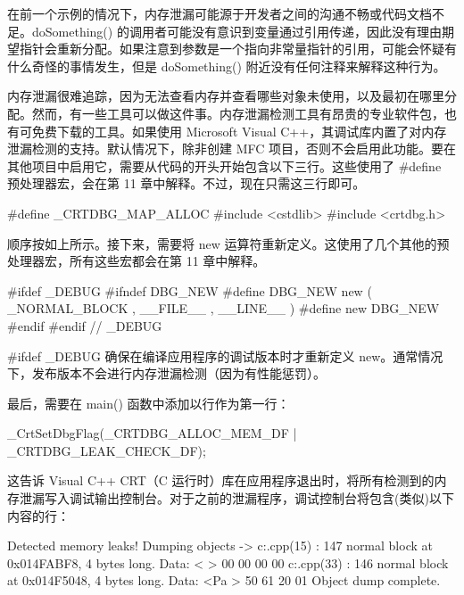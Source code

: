 在前一个示例的情况下，内存泄漏可能源于开发者之间的沟通不畅或代码文档不足。doSomething() 的调用者可能没有意识到变量通过引用传递，因此没有理由期望指针会重新分配。如果注意到参数是一个指向非常量指针的引用，可能会怀疑有什么奇怪的事情发生，但是 doSomething() 附近没有任何注释来解释这种行为。


内存泄漏很难追踪，因为无法查看内存并查看哪些对象未使用，以及最初在哪里分配。然而，有一些工具可以做这件事。内存泄漏检测工具有昂贵的专业软件包，也有可免费下载的工具。如果使用 Microsoft Visual C++，其调试库内置了对内存泄漏检测的支持。默认情况下，除非创建 MFC 项目，否则不会启用此功能。要在其他项目中启用它，需要从代码的开头开始包含以下三行。这些使用了 \#define 预处理器宏，会在第 11 章中解释。不过，现在只需这三行即可。

\begin{cpp}
#define _CRTDBG_MAP_ALLOC
#include <cstdlib>
#include <crtdbg.h>
\end{cpp}

顺序按如上所示。接下来，需要将 new 运算符重新定义。这使用了几个其他的预处理器宏，所有这些宏都会在第 11 章中解释。

\begin{cpp}
#ifdef _DEBUG
    #ifndef DBG_NEW
        #define DBG_NEW new ( _NORMAL_BLOCK , __FILE__ , __LINE__ )
        #define new DBG_NEW
    #endif
#endif // _DEBUG
\end{cpp}

\#ifdef \_DEBUG 确保在编译应用程序的调试版本时才重新定义 new。通常情况下，发布版本不会进行内存泄漏检测（因为有性能惩罚）。

最后，需要在 main() 函数中添加以行作为第一行：

\begin{cpp}
_CrtSetDbgFlag(_CRTDBG_ALLOC_MEM_DF | _CRTDBG_LEAK_CHECK_DF);
\end{cpp}

这告诉 Visual C++ CRT（C 运行时）库在应用程序退出时，将所有检测到的内存泄漏写入调试输出控制台。对于之前的泄漏程序，调试控制台将包含(类似)以下内容的行：

\begin{shell}
Detected memory leaks!
Dumping objects ->
c:\leaky\leaky.cpp(15) : {147} normal block at 0x014FABF8, 4 bytes long.
 Data: < > 00 00 00 00
c:\leaky\leaky.cpp(33) : {146} normal block at 0x014F5048, 4 bytes long.
 Data: <Pa > 50 61 20 01
Object dump complete.
\end{shell}

